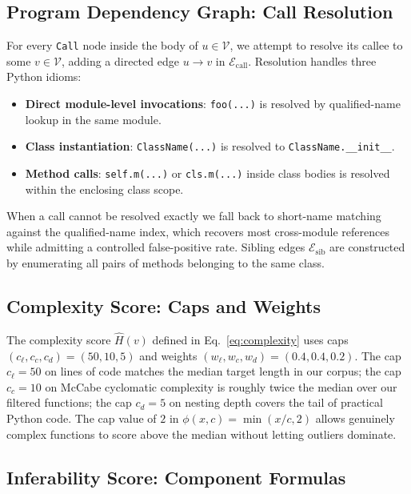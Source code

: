 \subsection{Program Dependency Graph: Call Resolution}
\label{app:algo:pdg}

For every \texttt{Call} node inside the body of $u \in \mathcal{V}$, we
attempt to resolve its callee to some $v \in \mathcal{V}$, adding a
directed edge $u \to v$ in $\mathcal{E}_{\mathrm{call}}$. Resolution
handles three Python idioms:

\begin{itemize}\setlength\itemsep{0.1em}
  \item \textbf{Direct module-level invocations}: \texttt{foo(...)} is
        resolved by qualified-name lookup in the same module.
  \item \textbf{Class instantiation}: \texttt{ClassName(...)} is
        resolved to \texttt{ClassName.\_\_init\_\_}.
  \item \textbf{Method calls}: \texttt{self.m(...)} or \texttt{cls.m(...)}
        inside class bodies is resolved within the enclosing class scope.
\end{itemize}

When a call cannot be resolved exactly we fall back to short-name
matching against the qualified-name index, which recovers most
cross-module references while admitting a controlled false-positive rate.
Sibling edges $\mathcal{E}_{\mathrm{sib}}$ are constructed by enumerating
all pairs of methods belonging to the same class.

\subsection{Complexity Score: Caps and Weights}
\label{app:algo:hyperparams}

The complexity score $\hat{H}(v)$ defined in Eq.~\eqref{eq:complexity}
uses caps $(c_{\ell}, c_{c}, c_{d}) = (50, 10, 5)$ and weights
$(w_{\ell}, w_{c}, w_{d}) = (0.4, 0.4, 0.2)$. The cap $c_{\ell} = 50$
on lines of code matches the median target length in our corpus; the
cap $c_c = 10$ on McCabe cyclomatic complexity is roughly twice the
median over our filtered functions; the cap $c_d = 5$ on nesting depth
covers the tail of practical Python code. The cap value of $2$ in
$\phi(x, c) = \min(x/c, 2)$ allows genuinely complex functions to score
above the median without letting outliers dominate.

\subsection{Inferability Score: Component Formulas}
\label{app:algo:inferability}

